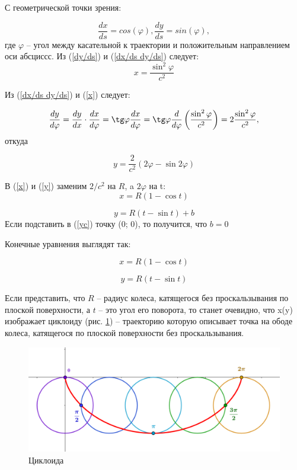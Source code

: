 \documentclass[a4paper, 12pt]{article}
\begin{document}
С геометрической точки зрения:

\begin{equation}
    \frac{dx}{ds} = cos(\varphi), \frac{dy}{ds} = sin(\varphi),
    \label{dx/ds dy/ds}
\end{equation}
где $\varphi$ -- угол между касательной к траектории и положительным направлением оси абсциссс.
Из (\ref{dy/ds}) и (\ref{dx/ds dy/ds}) следует:
\begin{equation}
    x = \frac{\sin^2\varphi}{c^2}
    \label{x}
\end{equation}

Из (\ref{dx/ds dy/ds}) и (\ref{x}) следует:

\begin{equation}
    \frac{dy}{d\varphi} = \frac{dy}{dx}\cdot\frac{dx}{d\varphi} = \tg\varphi \frac{dx}{d\varphi}=\tg\varphi\frac{d}{d\varphi}\left( \frac{\sin^2\varphi}{c^2} \right) = 2\frac{\sin^2\varphi}{c^2},
\end{equation}
откуда

\begin{equation}
    y = \frac{2}{c^2}(2\varphi-\sin2\varphi)
    \label{y}
\end{equation}

В (\ref{x}) и (\ref{y}) заменим $2/c^2$ на $R$, a $2\varphi$ на t:
\begin{equation}
    x = R(1-\cos t)
\end{equation}

\begin{equation}
    y = R(t-\sin t)+b
    \label{yc}
\end{equation}
Если подставить в (\ref{yc}) точку (0; 0), то получится, что $b=0$

Конечные уравнения выглядят так:

\begin{equation}
    x = R(1-\cos t)
\end{equation}

\begin{equation}
    y = R(t-\sin t)
\end{equation}

Если представить, что $R$ -- радиус колеса, катящегося без проскальзывания по плоской поверхности, а $t$ -- это угол его поворота, то станет очевидно, что x(y) изображает циклоиду (рис. \ref{cycloid}) -- траекторию которую описывает точка на ободе колеса, катящегося по плоской поверхности без проскальзывания.

\begin{figure}[ht!]
    \centering
    \includegraphics[width = 450pt]{cycloid.png}
    \caption{Циклоида}
    \label{cycloid}
\end{figure}
\end{document}
